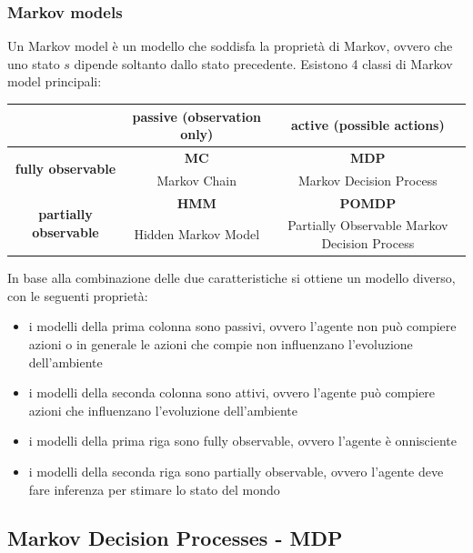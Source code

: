 \subsubsection*{Markov models}
Un Markov model è un modello che soddisfa la proprietà di Markov, ovvero che uno stato \(s\) dipende soltanto dallo stato
precedente. Esistono 4 classi di Markov model principali:
\begin{center}
	\begin{tabular}{c | c | c}
		& \textbf{passive} (observation only) & \textbf{active} (possible actions) \\
		\midrule
		\multirow{2}{*}{\textbf{fully observable}} & \textbf{MC} & \textbf{MDP} \\
		&\small Markov Chain & \small Markov Decision Process \\
		\midrule
		\multirow{2}{*}{\textbf{partially observable}} & \textbf{HMM} & \textbf{POMDP} \\
		& \small Hidden Markov Model & \small Partially Observable Markov Decision Process \\
		\bottomrule
	\end{tabular}
\end{center}
In base alla combinazione delle due caratteristiche si ottiene un modello diverso, con le seguenti proprietà:
\begin{itemize}
	\item i modelli della prima colonna sono passivi, ovvero l'agente non può compiere azioni o in generale le azioni
	che compie non influenzano l'evoluzione dell'ambiente
	\item i modelli della seconda colonna sono attivi, ovvero l'agente può compiere azioni che influenzano l'evoluzione
	dell'ambiente
	\item i modelli della prima riga sono fully observable, ovvero l'agente è onnisciente
	\item i modelli della seconda riga sono partially observable, ovvero l'agente deve fare inferenza per stimare
	lo stato del mondo
\end{itemize}

\newpage

\subsection{Markov Decision Processes - MDP}
